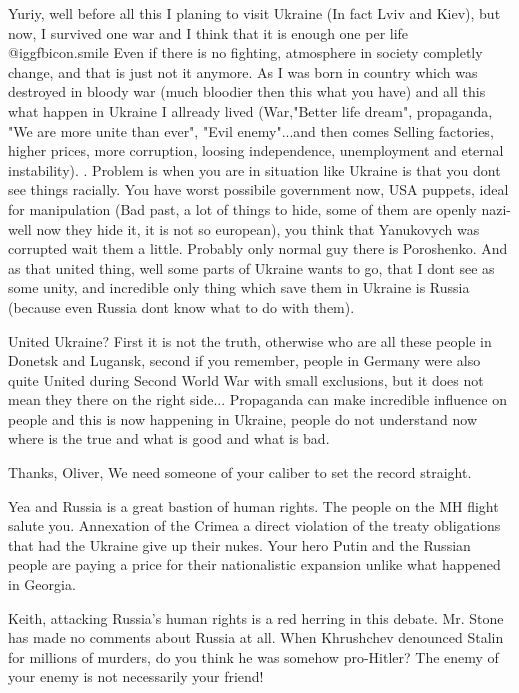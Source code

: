 \begin{itemize}
\begin{itemize}
Yuriy, well before all this I planing to visit Ukraine (In fact Lviv and Kiev),
but now, I survived one war and I think that it is enough one per life  @igg{fbicon.smile}  Even
if there is no fighting, atmosphere in society completly change, and that is
just not it anymore. As I was born in country which was destroyed in bloody war
(much bloodier then this what you have) and all this what happen in Ukraine I
allready lived (War,"Better life dream", propaganda, "We are more unite than
ever", "Evil enemy"...and then comes Selling factories, higher prices, more
corruption, loosing independence, unemployment and eternal instability). .
Problem is when you are in situation like Ukraine is that you dont see things
racially. You have worst possibile government now, USA puppets, ideal for
manipulation (Bad past, a lot of things to hide, some of them are openly
nazi-well now they hide it, it is not so european), you think that Yanukovych
was corrupted wait them a little. Probably only normal guy there is Poroshenko.
And as that united thing, well some parts of Ukraine wants to go, that I dont
see as some unity, and incredible only thing which save them in Ukraine is
Russia (because even Russia dont know what to do with them).


United Ukraine? First it is not the truth, otherwise who are all these people
in Donetsk and Lugansk, second if you remember, people in Germany were also
quite United during Second World War with small exclusions, but it does not
mean they there on the right side... Propaganda can make incredible influence
on people and this is now happening in Ukraine, people do not understand now
where is the true and what is good and what is bad.

\end{itemize} %

Thanks, Oliver, We need someone of your caliber to set the record straight.


Yea and Russia is a great bastion of human rights. The people on the MH flight
salute you. Annexation of the Crimea a direct violation of the treaty
obligations that had the Ukraine give up their nukes. Your hero Putin and the
Russian people are paying a price for their nationalistic expansion unlike what
happened in Georgia.

\begin{itemize} %

Keith, attacking Russia's human rights is a red herring in this debate. Mr.
Stone has made no comments about Russia at all. When Khrushchev denounced
Stalin for millions of murders, do you think he was somehow pro-Hitler? The
enemy of your enemy is not necessarily your friend!


\end{itemize}
\end{itemize}

